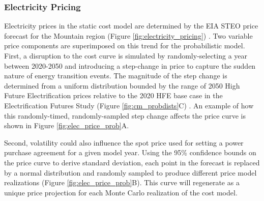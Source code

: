 \subsubsection{Electricity Pricing}\label{cm4:prob_price}
Electricity prices in the static cost model are determined by the EIA STEO price forecast for the Mountain region (Figure \ref{fig:electricity_pricing}) \citep{eia_short-term_2021}. Two variable price components are superimposed on this trend for the probabilistic model. First, a disruption to the cost curve is simulated by randomly-selecting a year between 2020-2050 and introducing a step-change in price to capture the sudden nature of energy transition events. The magnitude of the step change is determined from a uniform distribution bounded by the range of 2050 High Future Electrification prices relative to the 2020 HFE base case in the Electrification Futures Study (Figure \ref{fig:cm_probdists}C) \citep{murphy_electrification_2021}. An example of how this randomly-timed, randomly-sampled step change affects the price curve is shown in Figure \ref{fig:elec_price_prob}A. 

Second, volatility could also influence the spot price used for setting a power purchase agreement for a given model year. Using the 95\% confidence bounds on the price curve to derive standard deviation, each point in the forecast is replaced by a normal distribution and randomly sampled to produce different price model realizations (Figure \ref{fig:elec_price_prob}B). This curve will regenerate as a unique price projection for each Monte Carlo realization of the cost model.

